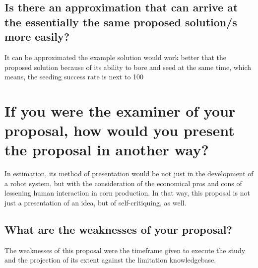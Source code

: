 		\subsection{Is there an approximation that can arrive at the essentially the same proposed solution/s more easily?}
		It can be approximated the example solution would work better that the proposed solution because of its ability to bore and seed at the same time, which means, the seeding success rate is next to 100%
		
\section{If you were the examiner of your proposal, how would you present the proposal in another way?}

In estimation, its method of presentation would be not just in the development of a robot system, but with the consideration of the economical pros and cons of lessening human interaction in corn production. In that way, this proposal is not just a presentation of an idea, but of self-critiquing, as well.

		\subsection{What are the weaknesses of your proposal?}
		
		The weaknesses of this proposal were the timeframe given to execute the study and the projection of its extent against the limitation knowledgebase.
